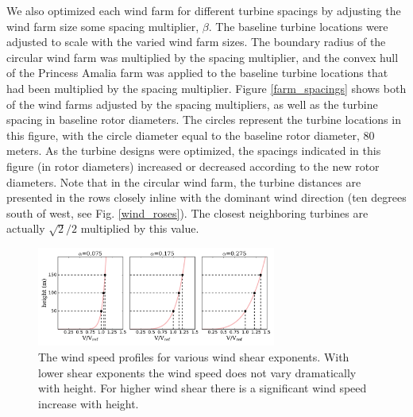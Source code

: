 \documentclass[WESD, manuscript]{copernicus}
\begin{document}
We also optimized each wind farm for different turbine spacings by adjusting the wind farm size some spacing multiplier, $\beta$. The baseline turbine locations were adjusted to scale with the varied wind farm sizes. The boundary radius of the circular wind farm was multiplied by the spacing multiplier, and the convex hull of the Princess Amalia farm was applied to the baseline turbine locations that had been multiplied by the spacing multiplier. Figure \ref{farm_spacings} shows both of the wind farms adjusted by the spacing multipliers, as well as the turbine spacing in baseline rotor diameters. The circles represent the turbine locations in this figure, with the circle diameter equal to the baseline rotor diameter, 80 meters. As the turbine designs were optimized, the spacings indicated in this figure (in rotor diameters) increased or decreased according to the new rotor diameters. Note that in the circular wind farm, the turbine distances are presented in the rows closely inline with the dominant wind direction (ten degrees south of west, see Fig. \ref{wind_roses}). The closest neighboring turbines are actually $\sqrt{2}/2$ multiplied by this value. 


\begin{figure}[htbp]
  \centering
  \includegraphics[width=0.7\textwidth]{Figures/shears.pdf}
  \caption{\label{shear_profile}The wind speed profiles for various wind shear exponents. With lower shear exponents the wind speed does not vary dramatically with height. For higher wind shear there is a significant wind speed increase with height.}
\end{figure}
\end{document}
